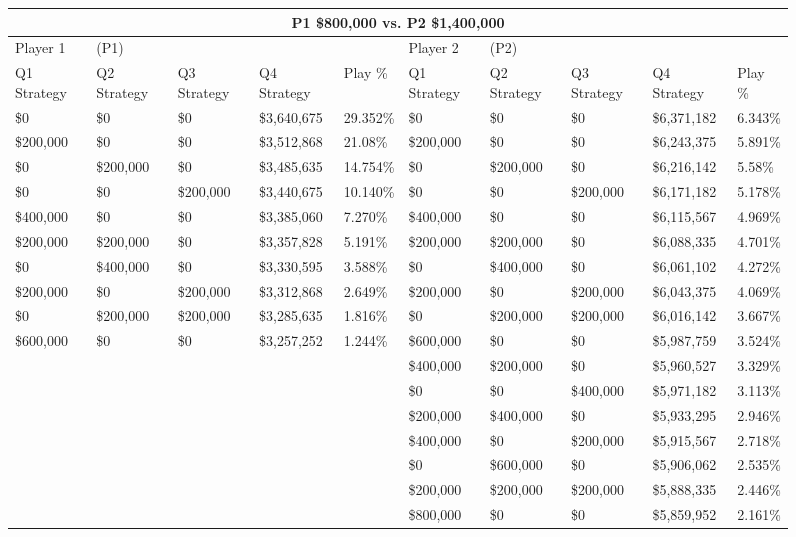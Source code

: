 \documentclass[11pt]{article}
\begin{document}
\begin{figure}
\tiny
\begin{tabular}{ |p{1.0cm}p{1.0cm}p{1.0cm}p{2.0cm}|p{1.0cm}||p{1.0cm}p{1.0cm}p{1.0cm}p{2.0cm}|p{1.0cm}|}
\hline
\multicolumn{10}{|c|}{P1 \$800,000 vs. P2 \$1,400,000} \\
\hline
Player 1 & (P1) & & & & Player 2 & (P2) & & & \\
\hline
Q1 Strategy & Q2 Strategy & Q3 Strategy & Q4 Strategy  &  Play \% & Q1 Strategy & Q2 Strategy & Q3 Strategy & Q4 Strategy  &  Play \%\\
\hline
\$0 & \$0 & \$0 & \$3,640,675 & 29.352\% & \$0 & \$0 & \$0 & \$6,371,182 & 6.343\% \\
\$200,000 & \$0 & \$0 & \$3,512,868 & 21.08\% & \$200,000 & \$0 & \$0 & \$6,243,375 & 5.891\% \\
\$0 & \$200,000 & \$0 & \$3,485,635 & 14.754\% & \$0 & \$200,000 & \$0 & \$6,216,142 & 5.58\% \\
\$0 & \$0 & \$200,000 & \$3,440,675 & 10.140\% & \$0 & \$0 & \$200,000 & \$6,171,182 & 5.178\% \\
\$400,000 & \$0 & \$0 & \$3,385,060 & 7.270\% & \$400,000 & \$0 & \$0 & \$6,115,567 & 4.969\% \\
\$200,000 & \$200,000 & \$0 & \$3,357,828 & 5.191\% & \$200,000 & \$200,000 & \$0 & \$6,088,335 & 4.701\% \\
\$0 & \$400,000 & \$0 & \$3,330,595 & 3.588\% & \$0 & \$400,000 & \$0 & \$6,061,102 & 4.272\% \\
\$200,000 & \$0 & \$200,000 & \$3,312,868 & 2.649\% & \$200,000 & \$0 & \$200,000 & \$6,043,375 & 4.069\% \\
\$0 & \$200,000 & \$200,000 & \$3,285,635 & 1.816\% & \$0 & \$200,000 & \$200,000 & \$6,016,142 & 3.667\% \\
\$600,000 & \$0 & \$0 & \$3,257,252 & 1.244\% & \$600,000 & \$0 & \$0 & \$5,987,759 & 3.524\% \\
&&&&&\$400,000 & \$200,000 & \$0 & \$5,960,527 & 3.329\% \\
&&&&&\$0 & \$0 & \$400,000 & \$5,971,182 & 3.113\% \\
&&&&&\$200,000 & \$400,000 & \$0 & \$5,933,295 & 2.946\% \\
&&&&&\$400,000 & \$0 & \$200,000 & \$5,915,567 & 2.718\% \\
&&&&&\$0 & \$600,000 & \$0 & \$5,906,062 & 2.535\% \\
&&&&&\$200,000 & \$200,000 & \$200,000 & \$5,888,335 & 2.446\% \\
&&&&&\$800,000 & \$0 & \$0 & \$5,859,952 & 2.161\% \\

\end{tabular}
\end{figure}
\end{document}
